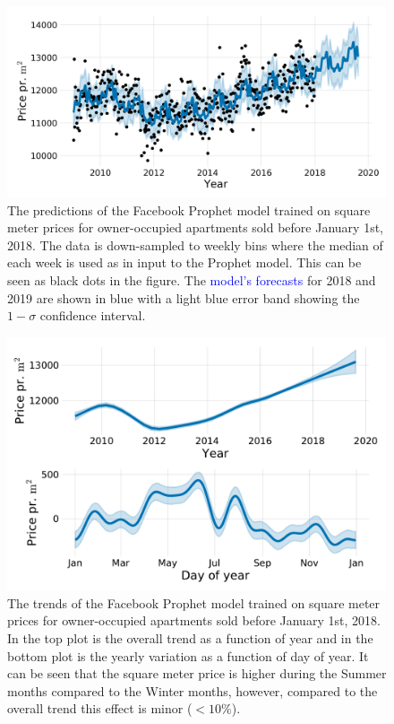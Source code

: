 \begin{figure}[h!]
  \includegraphics[draft=false, width=1\textwidth]{figures/housing/Villa_v18_cut_all_Ncols_all_prophet_forecast.png}
  \caption[Prophet Forecast for apartments]
          {The predictions of the Facebook Prophet model trained on square meter prices for owner-occupied apartments sold before January 1st, 2018. The data is down-sampled to weekly bins where the median of each week is used as in input to the Prophet model. This can be seen as black dots in the figure. The \textcolor{blue}{model's forecasts} for 2018 and 2019 are shown in blue with a light blue \textcolor{light-blue}{error band} showing the $1-\sigma$ confidence interval.
          }
  \label{fig:h:prophet_forecast_villa}
\end{figure}

\begin{figure}[h!]
  \includegraphics[draft=false, width=1\textwidth]{figures/housing/Villa_v18_cut_all_Ncols_all_prophet_trends.pdf}
  \caption[Prophet Trends]
          {The trends of the Facebook Prophet model trained on square meter prices for owner-occupied apartments sold before January 1st, 2018. In the top plot is the overall trend as a function of year and in the bottom plot is the yearly variation as a function of day of year. It can be seen that the square meter price is higher during the Summer months compared to the Winter months, however, compared to the overall trend this effect is minor ($<10\%$). 
          }
  \label{fig:h:prophet_trends_villa}
\end{figure}


